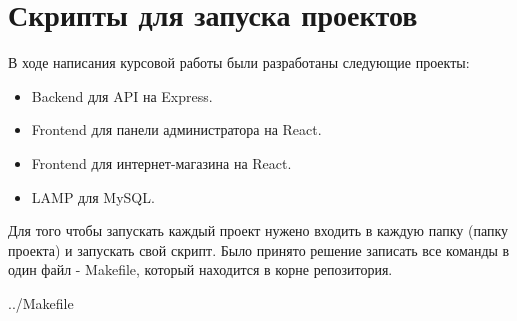 \newpage


\section{Скрипты для запуска проектов}

В ходе написания курсовой работы были разработаны следующие проекты:

\begin{itemize}
    \item Backend для API на Express.
    \item Frontend для панели администратора на React.
    \item Frontend для интернет-магазина на React.
    \item LAMP для MySQL.
\end{itemize}

Для того чтобы запускать каждый проект нужено входить в каждую папку (папку проекта)
и запускать свой скрипт. Было принято решение записать все команды в один файл - Makefile,
который находится в корне репозитория.


    {../Makefile}

\newpage
